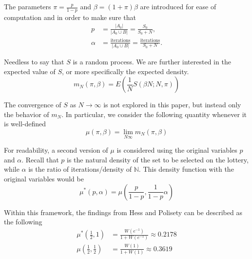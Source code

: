 \documentclass{article}
\newcommand{\N}{\mathbb{N}}
\newcommand{\card}[1]{\left| #1 \right|}
\newcommand{\ppar}[1]{\left( #1 \right)}
\begin{document}
The parameters $\pi = \frac{p}{1-p}$ and $\beta = \ppar{1+\pi} \beta$ are introduced for ease of computation and in order to make sure that
\begin{align}
    p &=
    \frac{\card{A_0}}{\card{A_0 \cup B}} = \frac{S_0}{S_0+N},
    \\
    \alpha &=
    \frac{\text{iterations}}{\card{A_0 \cup B}} =
    \frac{\text{iterations}}{S_0+N}.
\end{align}

Needless to say that $S$ is a random process.
%
We are further interested in the expected value of $S$, or more specifically the expected density.
\begin{equation}
    m_N\ppar{\pi, \beta} = E\ppar{\frac{1}{N}S\ppar{\beta N; N, \pi }}
\end{equation}

The convergence of $S$ as $N \rightarrow \infty$ is not explored in this paper, but instead only the behavior of $m_N$. 
%
In particular, we consider the following quantity whenever it is well-defined
\begin{equation}
    \mu\ppar{\pi, \beta} = \lim_{N\infty} m_N\ppar{\pi, \beta}
\end{equation}

For readability, a second version of $\mu$ is considered using the original variables $p$ and $\alpha$. 
%
Recall that $p$ is the natural density of the set to be selected on the lottery, while $\alpha$ is the ratio of iterations/density of $\N$.
%
This density function with the original variables would be
\begin{equation}
    \mu^*\ppar{p, \alpha} = \mu\ppar{\frac{p}{1-p}, \frac{1}{1-p} \alpha}
\end{equation}

Within this framework,
the findings from Hess and Polisety \cite{hess2023} can be described as the following
\begin{align}
\mu^*\ppar{\frac{1}{2}, 1}
    &=
    \frac{W\ppar{e^{-1}}}{1+W\ppar{e^{-1}}} \approx 0.2178
    \\
\mu\ppar{\frac{1}{2}, \frac{1}{2}}
    &=
    \frac{W\ppar{1}}{1+W\ppar{1}} \approx 0.3619
\end{align}

\end{document}
